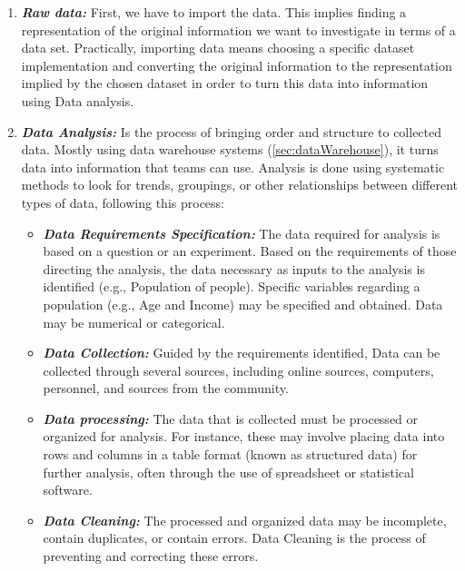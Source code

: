  
\begin{enumerate}
  \item \textbf{\textit{Raw data:}} First, we have to import the data. This implies finding a representation of the original information we want to investigate in terms of a data set. Practically, importing data means choosing a specific dataset implementation and converting the original information to the representation implied by the chosen dataset in order to turn this data into information using Data analysis.
  \item \textbf{\textit{Data Analysis:}} Is the process of bringing order and structure to collected data. Mostly using data warehouse systems (\ref{sec:dataWarehouse}), it turns data into information that teams can use. Analysis is done using systematic methods to look for trends, groupings, or other relationships between different types of data\cite{DataAnalysisVisualization}, following this process:
  \begin{itemize}
    \renewcommand{\labelitemi}{$\bullet$}
  \item \textbf{\textit{Data Requirements Specification:}} The data required for analysis is based on a question or an experiment. Based on the requirements of those directing the analysis, the data necessary as inputs to the analysis is identified (e.g., Population of people). Specific variables regarding a population (e.g., Age and Income) may be specified and obtained. Data may be numerical or categorical\cite{DataAnalysisProcess}.
  \item \textbf{\textit{Data Collection:}} Guided by the requirements identified, Data can be collected through several sources, including online sources, computers, personnel, and sources from the community.
  \item \textbf{\textit{Data processing:}} The data that is collected must be processed or organized for analysis. For instance, these may involve placing data into rows and columns in a table format (known as structured data) for further analysis, often through the use of spreadsheet or statistical software\cite{DataAnalysis2022}.
  \item \textbf{\textit{Data Cleaning:}} The processed and organized data may be incomplete, contain duplicates, or contain errors. Data Cleaning is the process of preventing and correcting these errors\cite{DataAnalysisProcess}. 

\end{itemize}
\end{enumerate}
